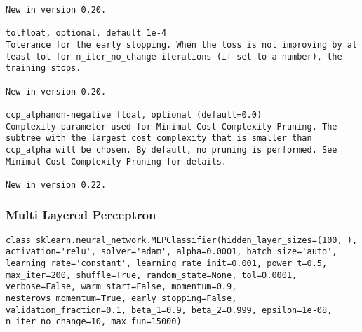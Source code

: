 \documentclass[12pt]{article}
\begin{document}
\begin{verbatim}
New in version 0.20.

tolfloat, optional, default 1e-4
Tolerance for the early stopping. When the loss is not improving by at least tol for n_iter_no_change iterations (if set to a number), the training stops.

New in version 0.20.

ccp_alphanon-negative float, optional (default=0.0)
Complexity parameter used for Minimal Cost-Complexity Pruning. The subtree with the largest cost complexity that is smaller than ccp_alpha will be chosen. By default, no pruning is performed. See Minimal Cost-Complexity Pruning for details.

New in version 0.22.
\end{verbatim}

\newpage
\subsubsection{Multi Layered Perceptron}
\begin{lstlisting}
class sklearn.neural_network.MLPClassifier(hidden_layer_sizes=(100, ), activation='relu', solver='adam', alpha=0.0001, batch_size='auto', learning_rate='constant', learning_rate_init=0.001, power_t=0.5, max_iter=200, shuffle=True, random_state=None, tol=0.0001, verbose=False, warm_start=False, momentum=0.9, nesterovs_momentum=True, early_stopping=False, validation_fraction=0.1, beta_1=0.9, beta_2=0.999, epsilon=1e-08, n_iter_no_change=10, max_fun=15000)
\end{lstlisting}
\end{document}

